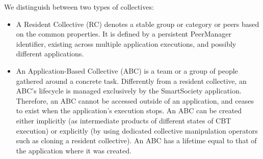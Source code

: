 We distinguish between two types of collectives: 
\begin{itemize}
\item A Resident Collective (RC) denotes a stable group or category or peers based on the common properties. It is defined by a persistent PeerManager identifier, existing across multiple application executions, and possibly different applications. 
\item An Application-Based Collective (ABC) is a team or a group of people gathered around a concrete task. Differently from a resident collective, an ABC's lifecycle is managed exclusively by the SmartSociety application. Therefore, an ABC cannot be accessed outside of an application, and ceases to exist when the application's execution stops. An ABC can be created either implicitly (as intermediate products of different states of CBT execution) or explicitly (by using dedicated collective manipulation operators such as cloning a resident collective). An ABC has a lifetime equal to that of the application where it was created.
\end{itemize}
